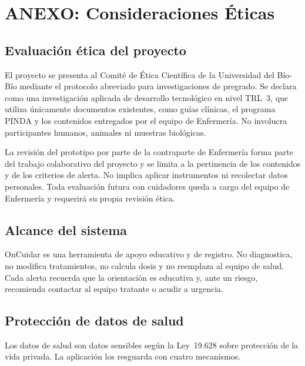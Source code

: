 \chapter[Anexo: Consideraciones Éticas]{ANEXO: Consideraciones Éticas}

\section{Evaluación ética del proyecto}

El proyecto se presenta al Comité de Ética Científica de la Universidad del
Bío-Bío mediante el protocolo abreviado para investigaciones de pregrado. Se
declara como una investigación aplicada de desarrollo tecnológico en nivel
TRL~3, que utiliza únicamente documentos existentes, como guías clínicas, el
programa PINDA y los contenidos entregados por el equipo de Enfermería. No
involucra participantes humanos, animales ni muestras biológicas.

La revisión del prototipo por parte de la contraparte de Enfermería forma parte
del trabajo colaborativo del proyecto y se limita a la pertinencia de los
contenidos y de los criterios de alerta. No implica aplicar instrumentos ni
recolectar datos personales. Toda evaluación futura con cuidadores queda a cargo
del equipo de Enfermería y requerirá su propia revisión ética.

\section{Alcance del sistema}

OnCuidar es una herramienta de apoyo educativo y de registro. No diagnostica, no
modifica tratamientos, no calcula dosis y no reemplaza al equipo de salud. Cada
alerta recuerda que la orientación es educativa y, ante un riesgo, recomienda
contactar al equipo tratante o acudir a urgencia.

\section{Protección de datos de salud}

Los datos de salud son datos sensibles según la Ley~19.628 sobre protección de
la vida privada. La aplicación los resguarda con cuatro mecanismos.

